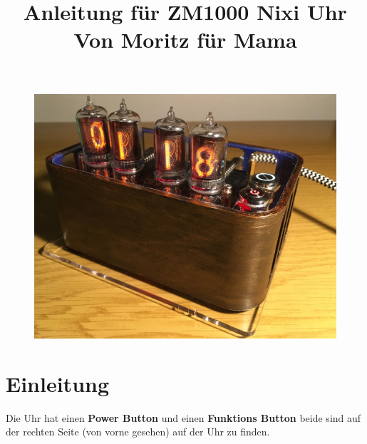 \documentclass[a4paper,12pt]{article}
\title{\textbf{Anleitung für ZM1000 Nixi Uhr \newline Von Moritz für Mama}}
\begin{document}
\maketitle

\begin{figure}[h!]
    \centering
    \includegraphics[width=1\textwidth]{Clock.jpg}
\end{figure}



\newpage

\section{Einleitung}

Die Uhr hat einen \textbf{Power Button} und einen \textbf{Funktions Button} beide sind auf der rechten Seite (von vorne gesehen) auf der Uhr zu finden.
\end{document}

